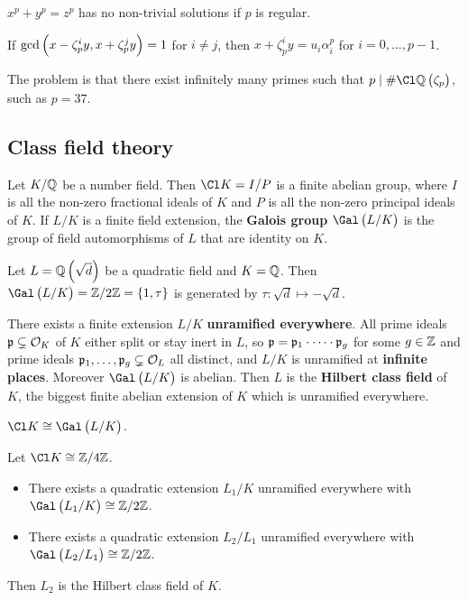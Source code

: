 \begin{theorem}[Kummer]
$ x^p + y^p = z^p $ has no non-trivial solutions if $ p $ is regular.
\end{theorem}

\begin{example*}
If $ \gcd\br{x - \zeta_p^iy, x + \zeta_p^jy} = 1 $ for $ i \ne j $, then $ x + \zeta_p^iy = u_i\alpha_i^p $ for $ i = 0, \dots, p - 1 $.
\end{example*}

The problem is that there exist infinitely many primes such that $ p \mid \#\Cl \QQ\br{\zeta_p} $, such as $ p = 37 $.

\subsection{Class field theory}

Let $ K / \mathbb{Q} $ be a number field. Then $ \Cl K = I / P $ is a finite abelian group, where $ I $ is all the non-zero fractional ideals of $ K $ and $ P $ is all the non-zero principal ideals of $ K $. If $ L / K $ is a finite field extension, the \textbf{Galois group} $ \Gal\br{L / K} $ is the group of field automorphisms of $ L $ that are identity on $ K $.

\begin{example*}
Let $ L = \QQ\br{\sqrt{d}} $ be a quadratic field and $ K = \mathbb{Q} $. Then $ \Gal\br{L / K} = \ZZ / 2\ZZ = \cbr{1, \tau} $ is generated by $ \tau : \sqrt{d} \mapsto -\sqrt{d} $.
\end{example*}

There exists a finite extension $ L / K $ \textbf{unramified everywhere}. All prime ideals $ \mathfrak{p} \subsetneq \mathcal{O}_K $ of $ K $ either split or stay inert in $ L $, so $ \mathfrak{p} = \mathfrak{p}_1 \cdot \dots \cdot \mathfrak{p}_g $ for some $ g \in \mathbb{Z} $ and prime ideals $ \mathfrak{p}_1, \dots, \mathfrak{p}_g \subsetneq \mathcal{O}_L $ all distinct, and $ L / K $ is unramified at \textbf{infinite places}. Moreover $ \Gal\br{L / K} $ is abelian. Then $ L $ is the \textbf{Hilbert class field} of $ K $, the biggest finite abelian extension of $ K $ which is unramified everywhere.

\begin{theorem}
$ \Cl K \cong \Gal\br{L / K} $.
\end{theorem}

\begin{example*}
Let $ \Cl K \cong \ZZ / 4\ZZ $.
\begin{itemize}
\item There exists a quadratic extension $ L_1 / K $ unramified everywhere with $ \Gal\br{L_1 / K} \cong \ZZ / 2\ZZ $.
\item There exists a quadratic extension $ L_2 / L_1 $ unramified everywhere with $ \Gal\br{L_2 / L_1} \cong \ZZ / 2\ZZ $.
\end{itemize}
Then $ L_2 $ is the Hilbert class field of $ K $.
\end{example*}

